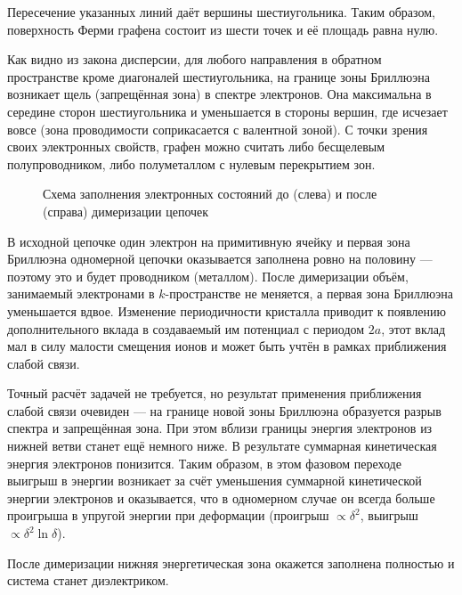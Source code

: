 \documentclass[a4paper]{article}
\begin{document}
\begin{sol}
Пересечение указанных линий даёт вершины шестиугольника.
Таким образом, поверхность Ферми графена состоит
из шести точек и её площадь равна нулю.

Как видно из закона дисперсии, для любого направления
в обратном пространстве кроме диагоналей шестиугольника, на границе зоны Бриллюэна возникает щель 
(запрещённая зона) в спектре электронов. Она
максимальна в середине сторон шестиугольника и
уменьшается в стороны вершин, где исчезает вовсе
(зона проводимости соприкасается с валентной
зоной). С точки зрения своих электронных свойств,
графен можно считать либо бесщелевым полупроводником,
либо полуметаллом с нулевым перекрытием зон.
\end{sol}
\begin{hiProb}[Т4-2]
\end{hiProb}
\begin{sol}
\begin{figure}[ht]
    \centering
    \caption{Схема заполнения электронных состояний до (слева)
    и после (справа) димеризации цепочек}
    \label{fig:6}
\end{figure}
В исходной цепочке один электрон на примитивную ячейку и первая
зона Бриллюэна одномерной цепочки оказывается заполнена ровно на половину --- поэтому это и будет проводником (металлом). После димеризации объём, занимаемый
электронами в $k$-пространстве не меняется, а первая
зона Бриллюэна уменьшается вдвое. Изменение
периодичности кристалла приводит к появлению
дополнительного вклада в создаваемый им потенциал
с периодом $2a$, этот вклад мал в силу малости смещения ионов и может быть учтён в рамках приближения слабой
связи.

Точный расчёт задачей не требуется, но результат
применения приближения слабой связи очевиден ---
на границе новой зоны Бриллюэна образуется
разрыв спектра и запрещённая зона. При этом
вблизи границы энергия электронов из нижней
ветви станет ещё немного ниже. В результате
суммарная кинетическая энергия электронов понизится.
Таким образом, в этом фазовом переходе выигрыш
в энергии возникает за счёт уменьшения
суммарной кинетической энергии электронов и
оказывается, что в одномерном случае
он всегда больше проигрыша в упругой энергии при
деформации (проигрыш $\propto \delta^2$, выигрыш
$\propto \delta^2 \ln \delta$).

После димеризации нижняя энергетическая зона
окажется заполнена полностью и система станет
диэлектриком.
\end{sol}
\begin{hiProb}[Т4-3]
\end{hiProb}
\end{document}
